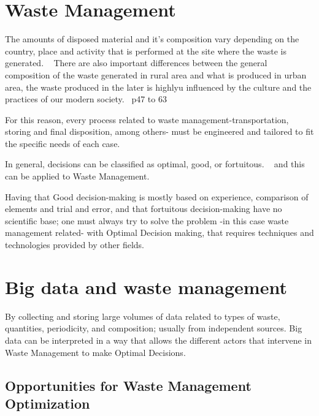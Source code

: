 \documentclass[sigconf]{acmart}
\begin{document}
\section{ Waste Management}

The amounts of disposed material and it’s composition vary depending on the country, place and activity that is performed at the site where the waste is generated. ~\cite{chandrappa2012} 
There are also important differences between the general composition of the waste generated in rural area and what is produced in urban area, the waste produced in the later is highlyu influenced by the culture and the practices of our modern society.~\cite{chandrappa2012} p47 to 63

For this reason, every process related to waste management-transportation, storing and final disposition, among others- must be engineered and tailored to fit the specific needs of each case.

In general, decisions can be classified as optimal, good, or fortuitous. ~\cite{akbarpour2016} and this can be applied to Waste Management.

Having that Good decision-making is mostly based on experience, comparison of elements and trial and error, and that fortuitous decision-making have no scientific base; one must always try to solve the problem -in this case waste management related- with Optimal Decision making, that requires techniques and technologies provided by other fields. 
 ~\cite{akbarpour2016}

\section{ Big data and waste management}
By collecting and storing large volumes of  data related to types of waste, quantities, periodicity, and composition; usually from independent sources. Big data can be interpreted in a way that allows the different actors that intervene in Waste Management to make Optimal Decisions.~\cite{yenkar2014review}




\subsection{Opportunities for Waste Management Optimization}
\end{document}
